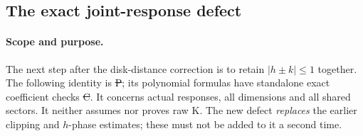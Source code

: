 \subsection{The exact joint-response defect}
\label{sec:joint-response-defect}
\paragraph{Scope and purpose.}
The next step after the disk-distance correction is to retain
$|h\pm k|\le1$ together. The following identity is \st{P}; its
polynomial formulas have standalone exact coefficient checks \st{C}.
It concerns actual responses, all dimensions and all shared sectors.
It neither assumes nor proves raw K. The new defect \emph{replaces}
the earlier clipping and $h$-phase estimates; these must not be added
to it a second time.

